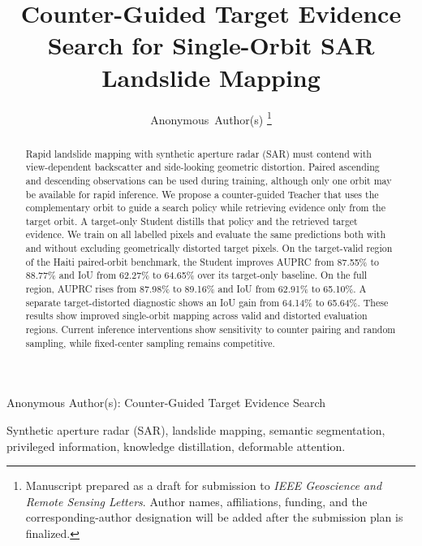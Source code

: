 \documentclass[journal]{IEEEtran}
\begin{document}
\title{Counter-Guided Target Evidence Search for Single-Orbit SAR Landslide Mapping}

\author{Anonymous~Author(s)%
\thanks{Manuscript prepared as a draft for submission to \emph{IEEE Geoscience and Remote Sensing Letters}. Author names, affiliations, funding, and the corresponding-author designation will be added after the submission plan is finalized.}}

%
{Anonymous Author(s): Counter-Guided Target Evidence Search}

\maketitle

\begin{abstract}
Rapid landslide mapping with synthetic aperture radar (SAR) must contend with view-dependent backscatter and side-looking geometric distortion. Paired ascending and descending observations can be used during training, although only one orbit may be available for rapid inference. We propose a counter-guided Teacher that uses the complementary orbit to guide a search policy while retrieving evidence only from the target orbit. A target-only Student distills that policy and the retrieved target evidence. We train on all labelled pixels and evaluate the same predictions both with and without excluding geometrically distorted target pixels. On the target-valid region of the Haiti paired-orbit benchmark, the Student improves AUPRC from 87.55\% to 88.77\% and IoU from 62.27\% to 64.65\% over its target-only baseline. On the full region, AUPRC rises from 87.98\% to 89.16\% and IoU from 62.91\% to 65.10\%. A separate target-distorted diagnostic shows an IoU gain from 64.14\% to 65.64\%. These results show improved single-orbit mapping across valid and distorted evaluation regions. Current inference interventions show sensitivity to counter pairing and random sampling, while fixed-center sampling remains competitive.
\end{abstract}

\begin{IEEEkeywords}
Synthetic aperture radar (SAR), landslide mapping, semantic segmentation, privileged information, knowledge distillation, deformable attention.
\end{IEEEkeywords}






{\scriptsize


}
\end{document}
